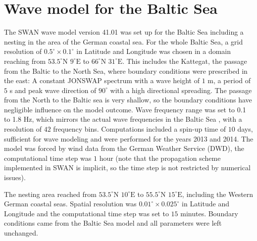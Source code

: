 \section{Wave model for the Baltic Sea}\label{balticswan}

The SWAN wave model version 41.01 was set up for the Baltic Sea including a 
nesting in the area of the German coastal sea. For the whole Baltic Sea, a grid 
resolution of $0.5^\circ \times 0.1^\circ $ in Latitude and Longitude was chosen 
in a domain reaching from $53.5^\circ \text{N } 9^\circ \text{E}$ to $66^\circ 
\text{N } 31^\circ \text{E}$. This includes the Kattegat, the passage from the 
Baltic to the North Sea, where boundary conditions were prescribed in the east: 
A constant JONSWAP spectrum with a wave height of $1$ m, a period of $5$ s and 
peak wave direction of $90^\circ$ with a high directional spreading. The passage 
from the North to the Baltic sea is very shallow, so the boundary conditions 
have negligible influence on the model outcome. Wave frequency range was set to 
0.1 to 1.8 Hz, which mirrors the actual wave frequencies in the Baltic 
Sea \citep[][]{balticsea}, with a resolution of $42$ frequency bins. 
Computations included a spin-up time of $10$ days, sufficient for wave modeling 
and were performed for the years 2013 and 2014. The model was forced by wind 
data from the German Weather Service (DWD), the computational time step was $1$ 
hour (note that the propagation scheme implemented in SWAN is implicit, so the 
time step is not restricted by numerical issues). 

The nesting area reached from $53.5^\circ \text{N } 10^\circ \text{E}$ to 
$55.5^\circ \text{N } 15^\circ \text{E}$, including the Western German coastal 
seas. Spatial resolution was $0.01^\circ \times 0.025^\circ $ in Latitude and 
Longitude and the computational time step was set to $15$ minutes. Boundary 
conditions came from the Baltic Sea model and all parameters were left 
unchanged.

